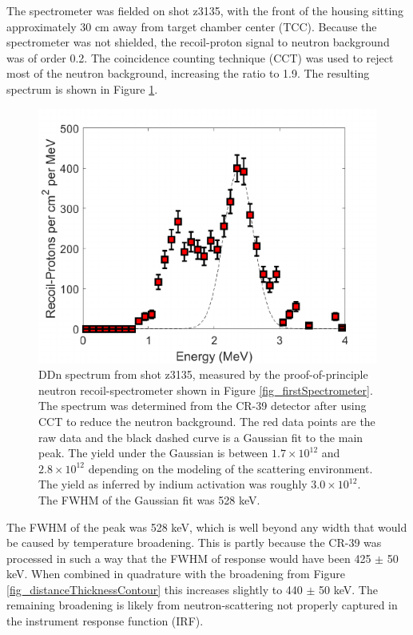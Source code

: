 The spectrometer was fielded on shot z3135, with the front of the housing sitting approximately 30 cm away from target chamber center (TCC). Because the spectrometer was not shielded, the recoil-proton signal to neutron background was of order 0.2. The coincidence counting technique (CCT) \cite{Lahmann_RSI_2016, Casey_RSI_2011} was used to reject most of the neutron background, increasing the ratio to 1.9. The resulting spectrum is shown in Figure \ref{fig_DDnSpectrum}.  

\begin{figure}[h!]
	
	\centering
	\includegraphics[scale=1.5]{Figures/DDnSpectrum.pdf}
	\caption{DDn spectrum from shot z3135, measured by the proof-of-principle neutron recoil-spectrometer shown in Figure \ref{fig_firstSpectrometer}. The spectrum was determined from the CR-39 detector after using CCT to reduce the neutron background. The red data points are the raw data and the black dashed curve is a Gaussian fit to the main peak. The yield under the Gaussian is between $1.7\times10^{12}$ and $2.8\times10^{12}$ depending on the modeling of the scattering environment. The yield as inferred by indium activation was roughly $3.0\times10^{12}$. The FWHM of the Gaussian fit was 528 keV.}
	\label{fig_DDnSpectrum}
	
\end{figure}

The FWHM of the peak was 528 keV, which is well beyond any width that would be caused by temperature broadening. This is partly because the CR-39 was processed in such a way that the FWHM of response would have been 425 $\pm$ 50 keV. When combined in quadrature with the broadening from Figure \ref{fig_distanceThicknessContour} this increases slightly to 440 $\pm$ 50 keV. The remaining broadening is likely from neutron-scattering not properly captured in the instrument response function (IRF).

